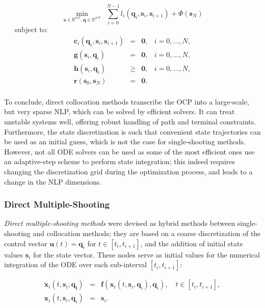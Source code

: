 \begin{equation}
  \min_{\mathbf{s}\in\mathbb R^{nN},\mathbf{q}\in\mathbb R^{nN}} \ \ \sum_{i=0}^{N-1}l_i(\mathbf{q}_i,\mathbf{s}_i,\mathbf{s}_{i+1}) + \Phi(\mathbf{s}_N)
\end{equation}
\ \ \ subject to:
\begin{equation}
  \begin{array}{rclr}
    \mathbf{c}_i(\mathbf{q}_i,\mathbf{s}_i,\mathbf{s}_{i+1}) & = & \mathbf{0}, & i=0,\ldots,N,%
    \\
    \mathbf{g}(\mathbf{s}_i,\mathbf{q}_i) & = & \mathbf{0}, & i=0,\ldots,N,%
    \\%
    \mathbf{h}(\mathbf{s}_i,\mathbf{q}_i) & \ge & \mathbf{0}, & i=0,\ldots,N,%
    \\%
    \mathbf{r} (\mathbf{s}_0, \mathbf{s}_N) & = & \mathbf{0}.%
    \\%
  \end{array}
\end{equation} 

To conclude, direct collocation methods transcribe the OCP into a
large-scale, but very sparse NLP, which can be solved by efficient
solvers. It can treat unstable systems well, offering robust handling
of path and terminal constraints. Furthermore, the state
discretization is such that convenient state trajectories can be used
as an initial guess, which is not the case for single-shooting
methods. However, not all ODE solvers can be used as some of the most
efficient ones use an adaptive-step scheme to perform state
integration; this indeed requires changing the discretization grid
during the optimization process, and leads to a change in the NLP
dimensions.

\subsubsection{Direct Multiple-Shooting}

\emph{Direct multiple-shooting methods} \cite{Bock1984} were devised
as hybrid methods between single-shooting and collocation methods;
they are based on a coarse discretization of the control vector
$\mathbf{u}(t)=\mathbf{q}_i$ for $t\in\left[t_i,t_{i+1}\right]$, and
the addition of initial state values $\mathbf{s}_i$ for the state
vector. These nodes serve as initial values for the numerical
integration of the ODE over each sub-interval $[t_i,t_{i+1}]$:

\begin{equation}
\begin{array}{rcl}
\dot{\mathbf{x}}_i(t,\mathbf{s}_i,\mathbf{q_i}) &=&
\mathbf{f}(\mathbf{x}_i(t,\mathbf{s}_i,\mathbf{q}_i),\mathbf{q}_i),
\quad t\in\left[t_i,t_{i+1}\right], \\
\mathbf{x}_i(t,\mathbf{s}_i,\mathbf{q}_i) &=& \mathbf{s}_i.
\end{array}
\end{equation} 

